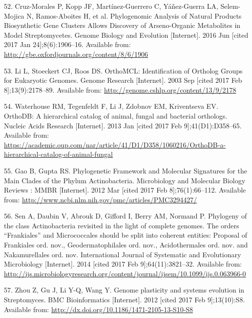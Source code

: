 \documentclass[12pt,twoside]{reedthesis}
\begin{document}
  \hypertarget{ref-cruz-morales_phylogenomic_2016}{}
  52. Cruz-Morales P, Kopp JF, Martínez-Guerrero C, Yáñez-Guerra LA,
  Selem-Mojica N, Ramos-Aboites H, et al. Phylogenomic Analysis of Natural
  Products Biosynthetic Gene Clusters Allows Discovery of Arseno-Organic
  Metabolites in Model Streptomycetes. Genome Biology and Evolution
  {[}Internet{]}. 2016 Jun {[}cited 2017 Jan 24{]};8(6):1906--16.
  Available from: \url{http://gbe.oxfordjournals.org/content/8/6/1906}
  
  \hypertarget{ref-li_orthomcl_2003}{}
  53. Li L, Stoeckert CJ, Roos DS. OrthoMCL: Identification of Ortholog
  Groups for Eukaryotic Genomes. Genome Research {[}Internet{]}. 2003 Sep
  {[}cited 2017 Feb 8{]};13(9):2178--89. Available from:
  \url{http://genome.cshlp.org/content/13/9/2178}
  
  \hypertarget{ref-waterhouse_orthodb_2013}{}
  54. Waterhouse RM, Tegenfeldt F, Li J, Zdobnov EM, Kriventseva EV.
  OrthoDB: A hierarchical catalog of animal, fungal and bacterial
  orthologs. Nucleic Acids Research {[}Internet{]}. 2013 Jan {[}cited 2017
  Feb 9{]};41(D1):D358--65. Available from:
  \url{https://academic.oup.com/nar/article/41/D1/D358/1060216/OrthoDB-a-hierarchical-catalog-of-animal-fungal}
  
  \hypertarget{ref-gao_phylogenetic_2012}{}
  55. Gao B, Gupta RS. Phylogenetic Framework and Molecular Signatures for
  the Main Clades of the Phylum Actinobacteria. Microbiology and Molecular
  Biology Reviews : MMBR {[}Internet{]}. 2012 Mar {[}cited 2017 Feb
  8{]};76(1):66--112. Available from:
  \url{http://www.ncbi.nlm.nih.gov/pmc/articles/PMC3294427/}
  
  \hypertarget{ref-sen_phylogeny_2014}{}
  56. Sen A, Daubin V, Abrouk D, Gifford I, Berry AM, Normand P. Phylogeny
  of the class Actinobacteria revisited in the light of complete genomes.
  The orders ``Frankiales'' and Micrococcales should be split into
  coherent entities: Proposal of Frankiales ord. nov., Geodermatophilales
  ord. nov., Acidothermales ord. nov. and Nakamurellales ord. nov.
  International Journal of Systematic and Evolutionary Microbiology
  {[}Internet{]}. 2014 {[}cited 2017 Feb 9{]};64(11):3821--32. Available
  from:
  \url{http://ijs.microbiologyresearch.org/content/journal/ijsem/10.1099/ijs.0.063966-0}
  
  \hypertarget{ref-zhou_genome_2012}{}
  57. Zhou Z, Gu J, Li Y-Q, Wang Y. Genome plasticity and systems
  evolution in Streptomyces. BMC Bioinformatics {[}Internet{]}. 2012
  {[}cited 2017 Feb 9{]};13(10):S8. Available from:
  \url{http://dx.doi.org/10.1186/1471-2105-13-S10-S8}
  
\end{document}
